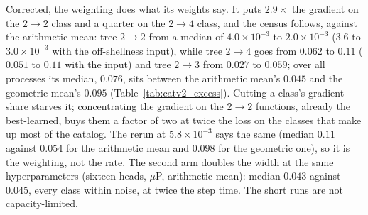 \documentclass[11pt]{article}
\begin{document}
Corrected, the weighting does what its weights say. It puts $2.9\times$ the gradient on the
$2\to2$ class and a quarter on the $2\to4$ class, and the census follows, against the
arithmetic mean: tree $2\to2$ from a median of $4.0\times10^{-3}$ to $2.0\times10^{-3}$
($3.6$ to $3.0\times10^{-3}$ with the off-shellness input), while tree $2\to4$ goes from $0.062$
to $0.11$ ($0.051$ to $0.11$ with the input) and tree $2\to3$ from $0.027$ to $0.059$; over all
processes its median, $0.076$, sits between the arithmetic mean's $0.045$ and the geometric
mean's $0.095$ (Table~\ref{tab:catv2_excess}). Cutting a class's gradient share starves it;
concentrating the gradient on the $2\to2$ functions, already the best-learned, buys them a
factor of two at twice the loss on the classes that make up most of the catalog. The rerun at $5.8\times10^{-3}$ says the same (median $0.11$ against $0.054$ for the arithmetic mean and $0.098$ for the
geometric one), so it is the weighting, not the rate. The second arm
doubles the width at the same hyperparameters (sixteen heads, $\mu$P, arithmetic mean):
median $0.043$ against $0.045$, every class within noise, at twice the step time. The short
runs are not capacity-limited.
\end{document}
